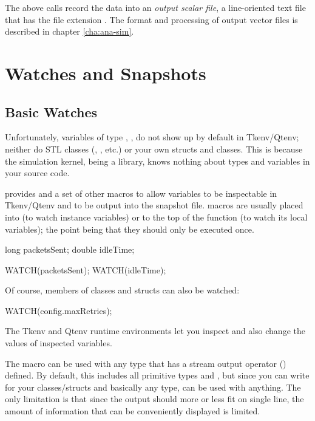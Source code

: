 The above calls record the data into an \textit{output scalar file},
a line-oriented text file that has the file extension .
The format and processing of output vector files is described in chapter
\ref{cha:ana-sim}.



\section{Watches and Snapshots}
\label{sec:sim-lib:watches-and-snapshots}

\subsection{Basic Watches}
\label{sec:sim-lib:basic-watches}

Unfortunately, variables of type , , 
do not show up by default in Tkenv/Qtenv; neither do STL classes
(, , etc.) or your own structs and
classes. This is because the simulation kernel, being a library, knows
nothing about types and variables in your source code.

{\opp} provides  and a set of other macros to
allow variables to be inspectable in Tkenv/Qtenv and to be output into the snapshot
file.  macros are usually placed into
 (to watch instance variables) or to the top of the
 function (to watch its local variables); the point being
that they should only be executed once.

\begin{cpp}
long packetsSent;
double idleTime;

WATCH(packetsSent);
WATCH(idleTime);
\end{cpp}

Of course, members of classes and structs can also be watched:

\begin{cpp}
WATCH(config.maxRetries);
\end{cpp}

The Tkenv and Qtenv runtime environments let you inspect and also change
the values of inspected variables.

The  macro can be used with any type that has a
stream output operator () defined. By default,
this includes all primitive types and , but since
you can write  for your classes/structs and basically
any type,  can be used with anything. The only limitation
is that since the output should more or less fit on single line, the
amount of information that can be conveniently displayed is limited.

